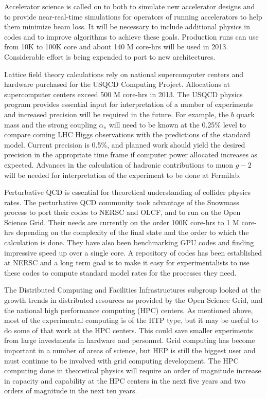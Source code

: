 Accelerator science is called on to both to simulate new accelerator designs and to provide near-real-time simulations for operators of running accelerators to help them minimize beam loss. It will be necessary to include additional physics in codes and to improve algorithms to achieve these goals. Production runs can use from 10K to 100K core and about 140 M core-hrs will be used in 2013.  Considerable effort is being expended to port to new architectures.

Lattice field theory calculations rely on national supercomputer centers and hardware purchased for the USQCD Computing Project. Allocations at supercomputer centers exceed 500 M core-hrs in 2013. The USQCD physics program provides essential input for interpretation of a number of experiments and increased precision will be required in the future.  For example, the $b$ quark mass and the strong coupling $\alpha_s$ will need to be known at the 0.25\% level to compare coming LHC Higgs observations with the predictions of the standard model.  Current precision is 0.5\%, and planned work should yield the desired precision in the appropriate time frame if computer power allocated increases as expected. Advances in the calculation of hadronic contributions to muon $g-2$ will be needed for interpretation of the experiment to be done at Fermilab.

Perturbative QCD is essential for theoretical understanding of collider physics rates. The perturbative QCD community took advantage of the Snowmass process to port their codes to NERSC and OLCF, and to run on the Open Science Grid. Their needs are currently on the order 100K core-hrs to 1 M core-hrs depending on the complexity of the final state and the order to which the calculation is done.  They have also been benchmarking GPU codes and finding impressive speed up over a single core.  A repository of codes has been established at NERSC and a long term goal is to make it easy for experimentalists to use these codes to compute standard model rates for the processes they need.

The Distributed Computing and Facilities Infrastructures subgroup looked at the growth trends in distributed resources as provided by the Open Science Grid, and the national high performance computing (HPC) centers.  As mentioned above, most of the experimental computing is of the HTP type, but it may be useful to do some of that work at the HPC centers.  This could save smaller experiments from large investments in hardware and personnel.  Grid computing has become important in a number of areas of science, but HEP is still the biggest user and must continue to be involved with grid computing development.  The HPC computing done in theoretical physics will require an order of magnitude increase in capacity and capability at the HPC centers in the next five years and two orders of magnitude in the next ten years.

